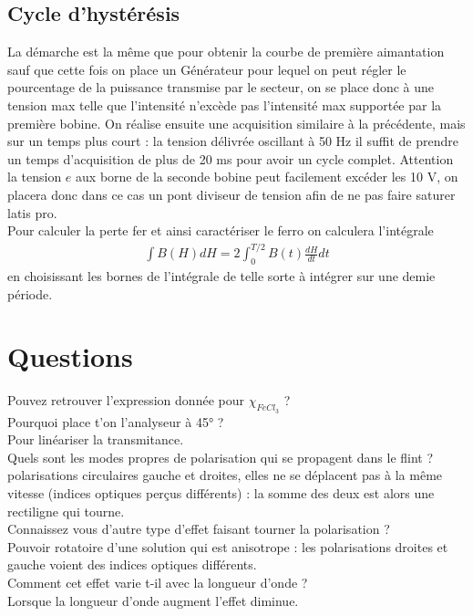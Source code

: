 \documentclass[12pt,prb,aps,epsf]{article}
\begin{document}
\subsection{Cycle d'hystérésis}
La démarche est la même que pour obtenir la courbe de première aimantation sauf que cette fois on place un Générateur pour lequel on peut régler le pourcentage de la puissance transmise par le secteur, on se place donc à une tension max telle que l'intensité n'excède pas l'intensité max supportée par la première bobine. On réalise ensuite une acquisition similaire à la précédente, mais sur un temps plus court : la tension délivrée oscillant à 50 Hz il suffit de prendre un temps d'acquisition de plus de 20 ms pour avoir un cycle complet. Attention la tension $e$ aux borne de la seconde bobine peut facilement excéder les 10 V, on placera donc dans ce cas un pont diviseur de tension afin de ne pas faire saturer latis pro.\\

Pour calculer la perte fer et ainsi caractériser le ferro on calculera l'intégrale 
\begin{eqnarray}
\int B(H) dH = 2\int_0^{T/2} B(t)\frac{dH}{dt} dt
\end{eqnarray}
en choisissant les bornes de l'intégrale de telle sorte à intégrer sur une demie période.

\section*{Questions}
Pouvez retrouver l'expression donnée pour $\chi_{FeCl_3}$ ?\\

Pourquoi place t'on l'analyseur à 45° ?\\
Pour linéariser la transmitance.\\

Quels sont les modes propres de polarisation qui se propagent dans le flint ?\\
polarisations circulaires gauche et droites, elles ne se déplacent pas à la même vitesse (indices optiques perçus différents) : la somme des deux est alors une rectiligne qui tourne.\\

Connaissez vous d'autre type d'effet faisant tourner la polarisation ?\\
Pouvoir rotatoire d'une solution qui est anisotrope : les polarisations droites et gauche voient des indices optiques différents.\\

Comment cet effet varie t-il avec la longueur d'onde ?\\
Lorsque la longueur d'onde augment l'effet diminue.
\end{document}
